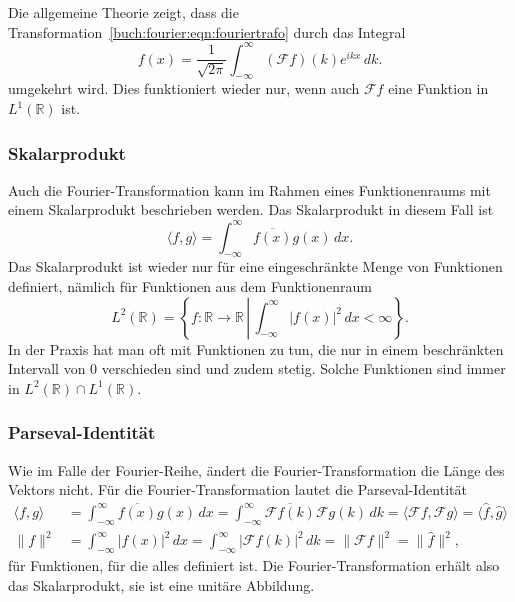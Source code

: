 Die allgemeine Theorie zeigt, dass die
Transformation~\eqref{buch:fourier:eqn:fouriertrafo}
durch das Integral
\[
f(x)
=
\frac{1}{\sqrt{2\pi}}
\int_{-\infty}^\infty (\mathscr{F}f)(k)e^{ikx}\,dk.
\]
umgekehrt wird.
Dies funktioniert wieder nur, wenn auch $\mathscr{F}f$ eine Funktion
in $L^1(\mathbb{R})$ ist.

%
%
\subsubsection{Skalarprodukt}
Auch die Fourier-Transformation kann im Rahmen eines Funktionenraums
mit einem Skalarprodukt beschrieben werden.
Das Skalarprodukt in diesem Fall ist
\[
\langle f,g\rangle
=
\int_{-\infty}^\infty \overline{f(x)} g(x)\,dx.
\]
Das Skalarprodukt ist wieder nur für eine eingeschränkte Menge von
Funktionen definiert, nämlich für Funktionen aus dem Funktionenraum
\[
L^2(\mathbb{R})
=
\left\{
f\colon\mathbb{R}\to\mathbb{R}
\,\left|\,
\int_{-\infty}^\infty |f(x)|^2\,dx < \infty
\right.
\right\}.
\]
In der Praxis hat man oft mit Funktionen zu tun, die nur in einem
beschränkten Intervall von $0$ verschieden sind und zudem stetig.
Solche Funktionen sind immer in $L^2(\mathbb{R})\cap L^1(\mathbb{R})$.

%
%
\subsubsection{Parseval-Identität}
Wie im Falle der Fourier-Reihe, ändert die Fourier-Transformation
die Länge des Vektors nicht.
Für die Fourier-Transformation lautet die Parseval-Identität
\begin{align*}
\langle f,g\rangle
&=
\int_{-\infty}^\infty
\overline{f(x)} g(x)\,dx
=
\int_{-\infty}^\infty
\overline{ \mathscr{F}f(k) }
\mathscr{F}g(k)\,dk
=
\langle \mathscr{F}f,\mathscr{F}g\rangle
=
\langle\hat{f},\hat{g}\rangle
\\
\|f\|^2
&=
\int_{-\infty}^\infty
|f(x)|^2\,dx
=
\int_{-\infty}^\infty
|\mathscr{F}f(k)|^2\,dk
=
\|\mathscr{F}f\|^2
=
\|\hat{f}\|^2,
\end{align*}
für Funktionen, für die alles definiert ist.
Die Fourier-Transformation erhält also das Skalarprodukt,
sie ist eine unitäre Abbildung.
